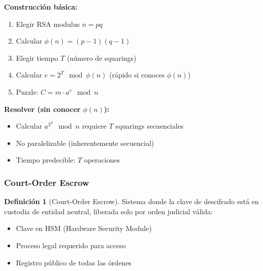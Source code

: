 \documentclass[11pt,a4paper,twoside]{book}
\theoremstyle{definition}
\newtheorem{definition}{Definición}[chapter]
\theoremstyle{remark}
\begin{document}
\begin{mathnote}
\textbf{Construcción básica:}
\begin{enumerate}
    \item Elegir RSA modulus $n = pq$
    \item Calcular $\phi(n) = (p-1)(q-1)$
    \item Elegir tiempo $T$ (número de squarings)
    \item Calcular $e = 2^T \mod \phi(n)$ (rápido si conoces $\phi(n)$)
    \item Puzzle: $C = m \cdot a^e \mod n$
\end{enumerate}

\textbf{Resolver (sin conocer $\phi(n)$):}
\begin{itemize}
    \item Calcular $a^{2^T} \mod n$ requiere $T$ squarings secuenciales
    \item No paralelizable (inherentemente secuencial)
    \item Tiempo predecible: $T$ operaciones
\end{itemize}
\end{mathnote}

\subsubsection{Court-Order Escrow}

\begin{definition}[Court-Order Escrow]
Sistema donde la clave de descifrado está en custodia de entidad neutral, liberada solo por orden judicial válida:
\begin{itemize}
    \item Clave en HSM (Hardware Security Module)
    \item Proceso legal requerido para acceso
    \item Registro público de todas las órdenes
\end{itemize}
\end{definition}
\end{document}
